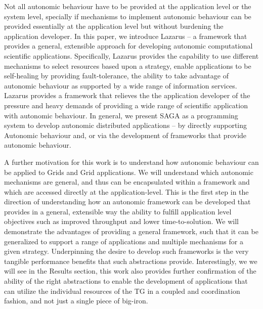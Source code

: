 \documentclass{sig-alternate}
\newcommand{\jhanote}[1]{ {\textcolor{red} { ***Jha: #1 }}}
\newcommand{\jhanote}[1]{}
\begin{document}
Not all autonomic behaviour have to be provided at the application level or the system level, specially if mechanisms to implement autonomic behaviour can be provided essentially at the application level but without burdening the application developer.  In this paper, we introduce Lazarus -- a framework that provides a general, extensible approach for developing autonomic computational scientific applications. Specifically, Lazarus provides the capability to use different mechanisms to select resources based upon a strategy, enable applications to be self-healing by providing fault-tolerance, the ability to take advantage of autonomic behaviour as supported by a wide range of information services. Lazarus provides a framework that relieves the the application developer of the pressure and heavy demands of providing a wide range of scientific application with autonomic behaviour.  In general, we present SAGA as a programming system to develop autonomic distributed applications -- by directly supporting Autonomic behaviour and, or via the development of frameworks that provide autonomic behaviour.
 
A further motivation for this work is to understand how autonomic behaviour can be applied to Grids and Grid applications. We will understand which autonomic mechanisms are general, and thus can be encapsulated within a framework and which are accessed directly at the application-level. This is the first step in the direction of understanding how an autonomic framework can be developed that provides in a general, extensible way the ability to fulfill application level objectives such as improved throughput and lower time-to-solution. We will demonstrate the advantages of providing a general framework, such that it can be generalized to support a range of applications and multiple mechanisms for a given strategy. Underpinning the desire to develop such frameworks is the very tangible performance benefits that such abstractions provide.  Interestingly, we we will see in the Results section, this work also provides further confirmation of the ability of the right abstractions to enable the development of applications that can utilize the individual resources of the TG in a coupled and coordination fashion, and not just a single piece of big-iron.

\end{document}
